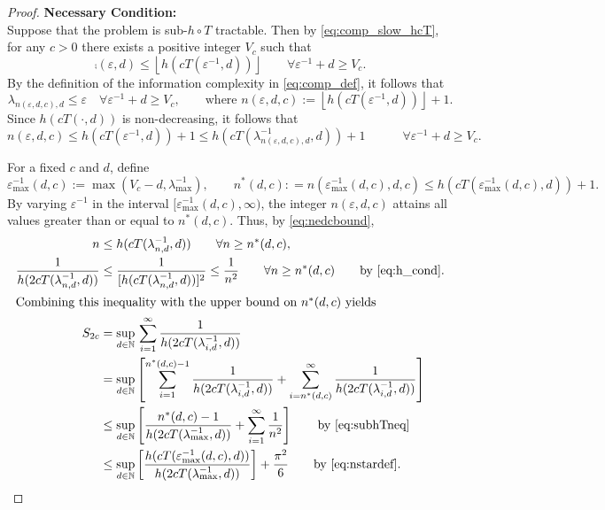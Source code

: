 \documentclass[11pt,a4paper]{article}
\begin{document}
\begin{proof}
\bigskip

\noindent \textbf{Necessary Condition:}\\
Suppose that the problem is  sub-$h \circ T$ tractable. Then by \eqref{eq:comp_slow_hcT}, for any $c>0$ there exists a positive integer $V_c$ such that
\begin{equation*}
	\comp(\varepsilon,d) \le \left\lfloor h(cT(\varepsilon^{-1},d)) \right\rfloor \qquad \forall \varepsilon^{-1} + d \ge V_c.
\end{equation*}
By the definition of the information complexity in \eqref{eq:comp_def}, it follows that
\[
	\lambda_{n(\varepsilon,d,c),d} \le \varepsilon \quad \forall \varepsilon^{-1} + d \ge V_c, \qquad \text{where }
	n(\varepsilon,d,c):=\left\lfloor h(cT(\varepsilon^{-1},d)) \right\rfloor +1.
\]
Since $h(cT(\cdot,d))$ is non-decreasing, it follows that
\begin{equation}
		n(\varepsilon,d,c)\le  h(cT(\varepsilon^{-1},d)) +1\le  h(cT(\lambda^{-1}_{n(\varepsilon,d,c),d},d)) +1\qquad  \quad \forall \varepsilon^{-1} + d \ge V_c. \label{eq:nedcbound}
\end{equation}

For a fixed $c$ and $d$, define
\begin{equation} \label{eq:nstardef}
	\varepsilon^{-1}_{\max}(d,c) := \max(V_c - d,\lambda_{\max}^{-1}), \qquad n^*(d,c) : = n(\varepsilon^{-1}_{\max}(d,c),d,c) \le h(cT(\varepsilon^{-1}_{\max}(d,c),d)) +1.
\end{equation}
By varying $\varepsilon^{-1}$ in the interval $[\varepsilon^{-1}_{\max}(d,c),\infty)$,  the integer $n(\varepsilon,d,c)$ attains all values greater than or equal to $n^*(d,c)$.  Thus, by \eqref{eq:nedcbound},
\begin{align}
		n &\le h(cT(\lambda^{-1}_{n,d},d)) \qquad  \forall n \ge n^*(d,c), \label{eq:subhTneq}\\
		\nonumber
		\frac{1}{h(2 cT(\lambda^{-1}_{n,d},d)) } & \le \frac{1}{[h(cT(\lambda^{-1}_{n,d},d))]^{2}}  \le \frac 1{n^2}   \qquad  \forall n \ge n^*(d,c) \qquad \text{by \eqref{eq:h_cond}}. \\
		\intertext{Combining this inequality with the upper bound on $n^*(d,c)$ yields}
		\nonumber
		S_{2c} & =\sup_{d\in\mathbb{N}}  \, \sum_{i=1}^\infty \frac1{h(2cT(\lambda_{i,d}^{-1},d))} \\
		\nonumber
		&  = \sup_{d\in\mathbb{N}} \left [
		\sum_{i=1}^{n^*(d,c)-1} \frac1{h(2cT(\lambda_{i,d}^{-1},d))}
		+ \sum_{i=n^*(d,c)}^\infty \frac1{h(2cT(\lambda_{i,d}^{-1},d))}
		\right]\\
		 \nonumber
		 & \le \sup_{d\in\mathbb{N}} \left [
\frac{n^*(d,c)-1}{h(2cT(\lambda_{\max}^{-1},d))}
+ \sum_{i=1}^\infty \frac1{n^2}
\right]
 \qquad \text{by \eqref{eq:subhTneq}}\\
 \label{eq:lastone}
		 & \le \sup_{d\in\mathbb{N}} \left [
		 \frac{ h(cT(\varepsilon^{-1}_{\max}(d,c),d))}{h(2cT(\lambda_{\max}^{-1},d))}
		\right] + \frac{\pi^2}{6}
		\qquad \text{by \eqref{eq:nstardef}.}
\end{align}


\end{proof}
\end{document}
